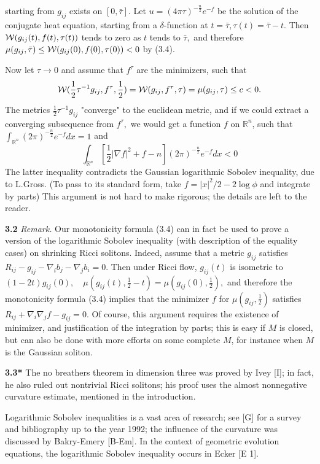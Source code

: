 \documentclass[12pt]{article}
\newcommand{\cW}{{\cal W}}
\theoremstyle{plain}
{\swapnumbers
\newtheorem{thm}{Theorem}[section]
\newtheorem{cor}[thm]{Corollary}
\newtheorem{lem}[thm]{Lemma}
\newtheorem{prop}[thm]{Proposition}
}
\theoremstyle{definition}
{\swapnumbers
\newtheorem{defn}[thm]{Definition}
\newtheorem{nota}[thm]{Notation}
\newtheorem{parag}[thm]{}
\newtheorem*{parstr}{\addtocounter{thm}{1}\thesection.\arabic{thm}*}
\newtheorem*{intropar}{\addtocounter{thm}{1}\arabic{thm}}
}
\theoremstyle{remark} {\swapnumbers
\newtheorem{rem}[thm]{Remark}
\newtheorem{exam}[thm]{Example}
\newtheorem{lemma}[thm]{Lemma}
\newtheorem{claim}[thm]{Claim}
}
\numberwithin{equation}{section}
\begin{document}
\begin{parag}
starting from $g_{ij}$ exists on $[0,\bar{\tau}].$ Let
$u=(4\pi\tau)^{-\frac{n}{2}}e^{-f}$ be the solution of the
conjugate heat equation, starting from a $\delta$-function at
$t=\bar{\tau}, \tau(t)=\bar{\tau}-t.$ Then
$\cW(g_{ij}(t),f(t),\tau(t))$ tends to zero as $t$ tends to
$\bar{\tau},$ and therefore
$\mu(g_{ij},\bar{\tau})\le\cW(g_{ij}(0),f(0),\tau(0))<0 $ by
(3.4).\par Now let $\tau\to 0$ and assume that $f^{\tau}$ are the
minimizers, such that
$$\cW(\frac{1}{2}\tau^{-1}g_{ij},f^{\tau},\frac{1}{2})
=\cW(g_{ij},f^{\tau},\tau)=\mu(g_{ij},\tau)\le c<0.$$ The metrics
$\frac{1}{2}\tau^{-1}g_{ij} $ "converge" to the euclidean metric,
and if we could extract a converging subsequence from $f^{\tau},$
we would get a function $f$ on $\mathbb{R}^n$, such that
$\int_{\mathbb{R}^n}{(2\pi)^{-\frac{n}{2}}e^{-f}dx}=1$ and $$
\int_{\mathbb{R}^n}{[\frac{1}{2}|\nabla
f|^2+f-n](2\pi)^{-\frac{n}{2}}e^{-f}dx}<0 $$ The latter inequality
contradicts the Gaussian logarithmic Sobolev inequality, due to
L.Gross. (To pass to its standard form, take $f=|x|^2/2-2\log\phi$
and integrate by parts) This argument is not hard to make
rigorous; the details are left  to the reader.
\end{parag}

\par {\bf 3.2} {\it  Remark.}  Our monotonicity formula (3.4) can in fact be
used to prove a version of the logarithmic Sobolev inequality
(with description of the equality cases) on shrinking Ricci
solitons. Indeed, assume that a metric $g_{ij}$ satisfies
$R_{ij}-g_{ij}-\nabla_i b_j-\nabla_j b_i=0.$ Then under Ricci
flow, $g_{ij}(t)$ is isometric to $(1-2t)g_{ij}(0),$\ \  $
\mu(g_{ij}(t),\frac{1}{2}-t)=\mu(g_{ij}(0),\frac{1}{2}),$ and
therefore the monotonicity formula (3.4) implies that the
minimizer $f$ for $\mu(g_{ij},\frac{1}{2})$ satisfies
$R_{ij}+\nabla_i\nabla_j f-g_{ij}=0.$ Of course, this argument
requires the existence of minimizer, and  justification of the
integration by parts; this is easy if $M$ is closed, but can also
be done with more efforts on some complete $M$, for instance when
$M$ is the Gaussian soliton. \par {\bf 3.3*} The no breathers
theorem in dimension three was proved by Ivey [I]; in fact, he
also ruled out nontrivial Ricci solitons; his proof uses the
almost nonnegative curvature estimate, mentioned in the
introduction.
\par Logarithmic Sobolev inequalities is a vast area of research;
see [G] for a survey and bibliography up to the year 1992; the
influence of the curvature was discussed by Bakry-Emery [B-Em]. In
the context of geometric evolution equations, the logarithmic
Sobolev inequality occurs in Ecker [E 1].
\end{document}
